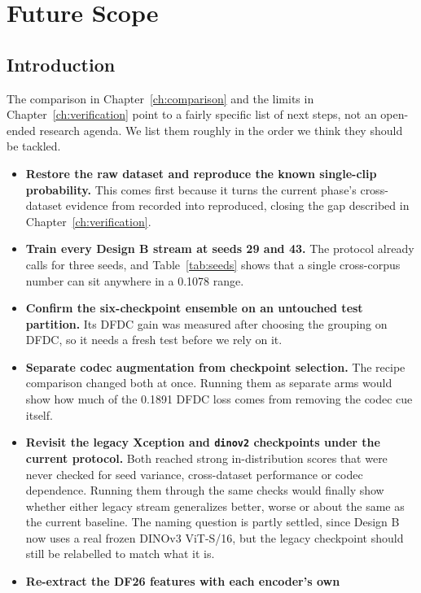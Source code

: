 \chapter{Future Scope}
\label{ch:future}

\section{Introduction}

The comparison in Chapter~\ref{ch:comparison} and the limits in
Chapter~\ref{ch:verification} point to a fairly specific list of next steps,
not an open-ended research agenda. We list them roughly in the order we think
they should be tackled.

\begin{itemize}
    \item \textbf{Restore the raw dataset and reproduce the known single-clip
    probability.} This comes first because it turns the current phase's
    cross-dataset evidence from recorded into reproduced, closing the gap
    described in Chapter~\ref{ch:verification}.
    \item \textbf{Train every Design B stream at seeds 29 and 43.} The protocol
    already calls for three seeds, and Table~\ref{tab:seeds} shows that a
    single cross-corpus number can sit anywhere in a 0.1078 range.
    \item \textbf{Confirm the six-checkpoint ensemble on an untouched test
    partition.} Its DFDC gain was measured after choosing the grouping on DFDC,
    so it needs a fresh test before we rely on it.
    \item \textbf{Separate codec augmentation from checkpoint selection.} The
    recipe comparison changed both at once. Running them as separate arms
    would show how much of the 0.1891 DFDC loss comes from removing the codec
    cue itself.
    \item \textbf{Revisit the legacy Xception and \texttt{dinov2} checkpoints
    under the current protocol.} Both reached strong in-distribution scores
    that were never checked for seed variance, cross-dataset performance or
    codec dependence. Running them through the same checks would finally show
    whether either legacy stream generalizes better, worse or about the same
    as the current baseline. The naming question is partly settled, since
    Design B now uses a real frozen DINOv3 ViT-S/16, but the legacy checkpoint
    should still be relabelled to match what it is.
    \item \textbf{Re-extract the DF26 features with each encoder's own
}
\end{itemize}
